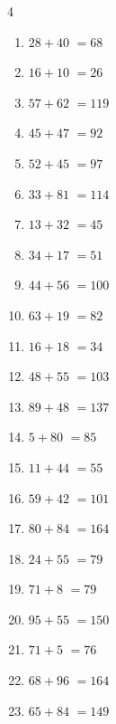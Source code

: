 \begin{multicols}{4}
\begin{enumerate}
  \item $28+40$
        $=68$

  \item $16+10$
        $=26$

  \item $57+62$
        $=119$

  \item $45+47$
        $=92$

  \item $52+45$
        $=97$

  \item $33+81$
        $=114$

  \item $13+32$
        $=45$

  \item $34+17$
        $=51$

  \item $44+56$
        $=100$

  \item $63+19$
        $=82$

  \item $16+18$
        $=34$

\columnbreak %

  \item $48+55$
        $=103$

  \item $89+48$
        $=137$

  \item $5+80$
        $=85$

  \item $11+44$
        $=55$

  \item $59+42$
        $=101$

  \item $80+84$
        $=164$

  \item $24+55$
        $=79$

  \item $71+8$
        $=79$

  \item $95+55$
        $=150$

  \item $71+5$
        $=76$

  \item $68+96$
        $=164$

  \item $65+84$
        $=149$


\end{enumerate}
\end{multicols}
